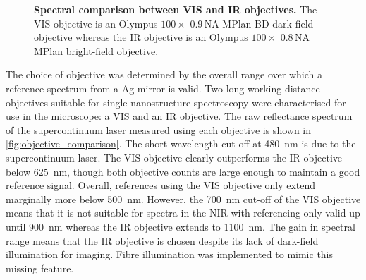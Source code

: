 \documentclass[12pt, a4paper, oneside]{book}
\begin{document}
\begin{figure}[bt]%
\vspace{-10pt}
\centering
{}
{\caption[Spectral comparison between VIS and IR objectives]{\textbf{Spectral comparison between VIS and IR objectives.} The VIS objective is an Olympus $100\times$ 0.9\,NA MPlan BD dark-field objective whereas the IR objective is an Olympus $100\times$ 0.8\,NA MPlan bright-field objective.}
\label{fig:objective_comparison}}
\vspace{-5pt}
\end{figure}

The choice of objective was determined by the overall range over which a reference spectrum from a Ag mirror is valid. Two long working distance objectives suitable for single nanostructure spectroscopy were characterised for use in the microscope: a VIS and an IR objective. The raw reflectance spectrum of the supercontinuum laser measured using each objective is shown in \autoref{fig:objective_comparison}. The short wavelength cut-off at \SI{480}{nm} is due to the supercontinuum laser. The VIS objective clearly outperforms the IR objective below \SI{625}{nm}, though both objective counts are large enough to maintain a good reference signal. Overall, references using the VIS objective only extend marginally more below \SI{500}{nm}. However, the \SI{700}{nm} cut-off of the VIS objective means that it is not suitable for spectra in the NIR with referencing only valid up until \SI{900}{nm} whereas the IR objective extends to \SI{1100}{nm}. The gain in spectral range means that the IR objective is chosen despite its lack of dark-field illumination for imaging. Fibre illumination was implemented to mimic this missing feature.
\end{document}

